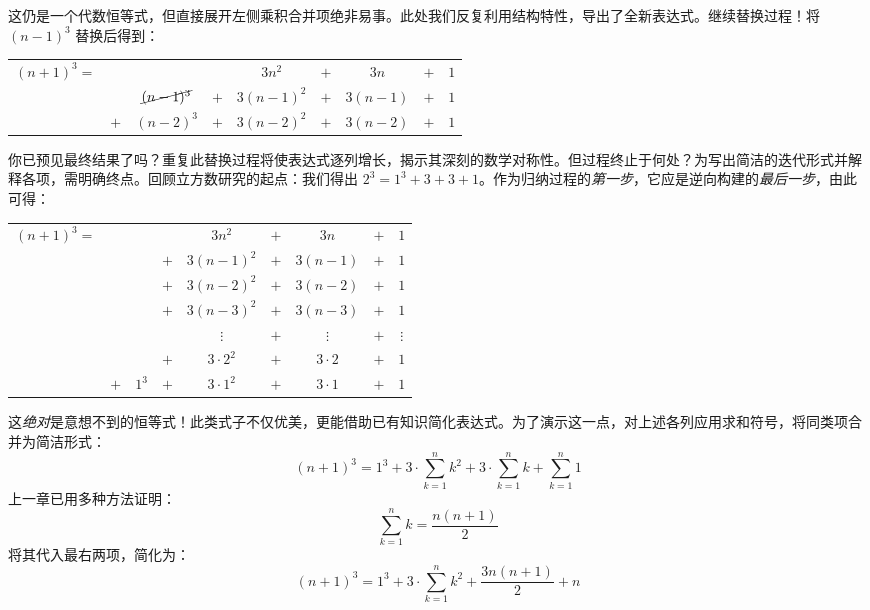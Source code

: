 这仍是一个代数恒等式，但直接展开左侧乘积合并项绝非易事。此处我们反复利用结构特性，导出了全新表达式。继续替换过程！将 $(n - 1)^3$ 替换后得到：

\begin{center}
    \begin{tabular}{rcccccccc}
        $(n+1)^3=$ &     &                    &     &   $3n^2$   & $+$ &   $3n$   & $+$ & $1$\\
                   &     & $\cancel{(n-1)^3}$ & $+$ & $3(n-1)^2$ & $+$ & $3(n-1)$ & $+$ & $1$\\
                   & $+$ & $(n-2)^3$          & $+$ & $3(n-2)^2$ & $+$ & $3(n-2)$ & $+$ & $1$\\
    \end{tabular}
\end{center}

你已预见最终结果了吗？重复此替换过程将使表达式逐列增长，揭示其深刻的数学对称性。但过程终止于何处？为写出简洁的迭代形式并解释各项，需明确终点。回顾立方数研究的起点：我们得出 $2^3 = 1^3 + 3 + 3 + 1$。作为归纳过程的\emph{第一步}，它应是逆向构建的\emph{最后一步}，由此可得：

\begin{center}
    \begin{tabular}{rcccccccc}
        $(n+1)^3=$ &     &       &     &   $3n^2$   & $+$ &   $3n$   & $+$ & $1$\\
                   &     &       & $+$ & $3(n-1)^2$ & $+$ & $3(n-1)$ & $+$ & $1$\\
                   &     &       & $+$ & $3(n-2)^2$ & $+$ & $3(n-2)$ & $+$ & $1$\\
                   &     &       & $+$ & $3(n-3)^2$ & $+$ & $3(n-3)$ & $+$ & $1$\\
                   &     &       &     & $\vdots$   & $+$ & $\vdots$ & $+$ & $\vdots$\\
                   &     &       & $+$ & $3 \cdot 2^2$ & $+$ & $3 \cdot 2$ & $+$ & $1$\\
                   & $+$ & $1^3$ & $+$ & $3 \cdot 1^2$ & $+$ & $3 \cdot 1$ & $+$ & $1$\\
    \end{tabular}
\end{center}

这\emph{绝对}是意想不到的恒等式！此类式子不仅优美，更能借助已有知识简化表达式。为了演示这一点，对上述各列应用求和符号，将同类项合并为简洁形式：
\[(n+1)^3 = 1^3+3 \cdot \sum_{k=1}^{n}k^2+3 \cdot \sum_{k=1}^{n}k+\sum_{k=1}^{n}1\]
上一章已用多种方法证明：
\[\sum_{k=1}^{n}k = \frac{n(n+1)}{2}\]
将其代入最右两项，简化为：
\[(n+1)^3 = 1^3+3 \cdot \sum_{k=1}^{n}k^2+\frac{3n(n+1)}{2}+n\]

